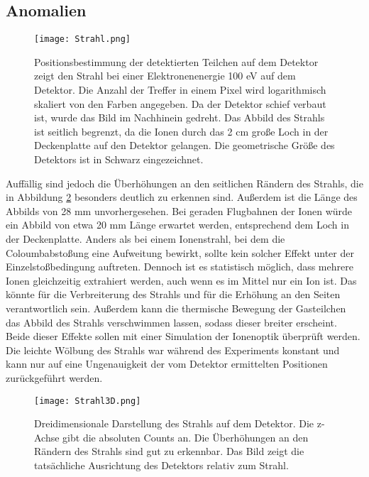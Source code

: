 \subsection{Anomalien}
\label{sec:Anomalien}
\begin{figure}
    \hspace{-1.1cm}\texttt{[image: Strahl.png]}
    \caption[Logarithmisches Abbild des Strahls auf dem Detektor]{Positionsbestimmung der detektierten Teilchen auf dem Detektor zeigt den Strahl bei einer Elektronenenergie 100 eV auf dem Detektor. Die Anzahl der Treffer in einem Pixel wird logarithmisch skaliert von den Farben angegeben. Da der Detektor schief verbaut ist, wurde das Bild im Nachhinein gedreht. Das Abbild des Strahls ist seitlich begrenzt, da die Ionen durch das 2 cm große Loch in der Deckenplatte auf den Detektor gelangen. Die geometrische Größe des Detektors ist in Schwarz eingezeichnet.}
    \label{fig:Strahl} 
\end{figure}
Auffällig sind jedoch die Überhöhungen an den seitlichen Rändern des Strahls, die in Abbildung \ref{fig:Strahl3D} besonders deutlich zu erkennen sind. Außerdem ist die Länge des Abbilds von 28 mm unvorhergesehen. Bei geraden Flugbahnen der Ionen würde ein Abbild von etwa 20 mm Länge erwartet werden, entsprechend dem Loch in der Deckenplatte. Anders als bei einem Ionenstrahl, bei dem die Coloumbabstoßung eine Aufweitung bewirkt, sollte kein solcher Effekt unter der Einzelstoßbedingung auftreten. Dennoch ist es statistisch möglich, dass mehrere Ionen gleichzeitig extrahiert werden, auch wenn es im Mittel nur ein Ion ist. Das könnte für die Verbreiterung des Strahls und für die Erhöhung an den Seiten verantwortlich sein. Außerdem kann die thermische Bewegung der Gasteilchen das Abbild des Strahls verschwimmen lassen, sodass dieser breiter erscheint. Beide dieser Effekte sollen mit einer Simulation der Ionenoptik überprüft werden. Die leichte Wölbung des Strahls war während des Experiments konstant und kann nur auf eine Ungenauigkeit der vom Detektor ermittelten Positionen zurückgeführt werden. 

\begin{figure}
    \hspace*{-0cm}\texttt{[image: Strahl3D.png]}
    \caption[Dreidimensionale Darstellung des Strahls auf dem Detektor]{Dreidimensionale Darstellung des Strahls auf dem Detektor. Die z-Achse gibt die absoluten Counts an. Die Überhöhungen an den Rändern des Strahls sind gut zu erkennbar. Das Bild zeigt die tatsächliche Ausrichtung des Detektors relativ zum Strahl.}
    \label{fig:Strahl3D} 
\end{figure}

